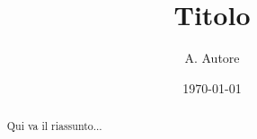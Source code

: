 \documentclass{article}
\title{Titolo}
\author{A. Autore}
\date{\today}
\begin{document}
\maketitle

\begin{abstract}
Qui va il riassunto...
\end{abstract}
\end{document}
